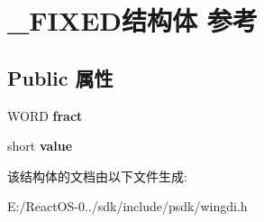 \hypertarget{struct___f_i_x_e_d}{}\section{\+\_\+\+F\+I\+X\+E\+D结构体 参考}
\label{struct___f_i_x_e_d}
\subsection*{Public 属性}
\begin{DoxyCompactItemize}
\item 
\mbox{\label{struct___f_i_x_e_d_aa339567a54aed9169ceca8c8d520b131}} 
W\+O\+RD {\bfseries fract}
\item 
\mbox{\label{struct___f_i_x_e_d_a411e0a4659c2cf6f686471a335784404}} 
short {\bfseries value}
\end{DoxyCompactItemize}


该结构体的文档由以下文件生成\+:\begin{DoxyCompactItemize}
\item 
E\+:/\+React\+O\+S-\/0../sdk/include/psdk/wingdi.\+h\end{DoxyCompactItemize}
